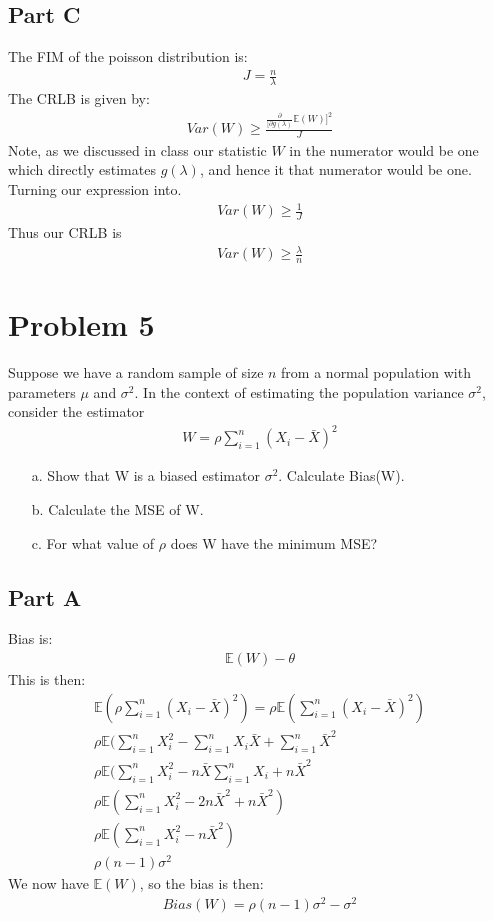 \documentclass{article}
\begin{document}
\subsection*{Part C}
The FIM of the poisson distribution is:
\begin{align*}
J = \frac{n}{\lambda}
\end{align*}
The CRLB is given by:
\begin{align*}
Var(W) \geq \frac{\frac{\partial}{[\partial g(\lambda)} \mathbb{E}(W)]^2 }{J}
\end{align*}
Note, as we discussed in class our statistic $W$ in the numerator would be one which directly estimates $g(\lambda)$, and hence it that numerator would be one. Turning our expression into.
\begin{align*}
Var(W) \geq \frac{1}{J} 
\end{align*}
Thus our CRLB is
\begin{align*}
\boxed{ Var(W) \geq \frac{\lambda}{n} }
\end{align*}
\clearpage

\section*{Problem 5}
Suppose we have a random sample of size $n$ from a normal population with parameters $\mu$ and $\sigma^2$. In the context of estimating the population variance $\sigma^2$, consider the estimator 
\begin{align*}
W = \rho \sum_{i=1}^{n} (X_i-\bar{X})^2
\end{align*}
\begin{enumerate}
\item[a.] Show that W is a biased estimator $\sigma^2$. Calculate Bias(W).
\item[b.] Calculate the MSE of W.
\item[c.] For what value of $\rho$ does W have the minimum MSE?
\end{enumerate}

\subsection*{Part A}
Bias is:
\begin{align*}
\mathbb{E}(W)-\theta
\end{align*}
This is then:
\begin{align*}
\mathbb{E}(\rho \sum_{i=1}^{n} (X_i-\bar{X})^2) = \rho \mathbb{E}(\sum_{i=1}^{n} (X_i-\bar{X})^2)\\
\rho \mathbb{E}(\sum_{i=1}^{n} X_i^2 -\sum_{i=1}^{n}X_i\bar{X}+\sum_{i=1}^{n}\bar{X}^2\\
\rho \mathbb{E}(\sum_{i=1}^{n} X_i^2 -n\bar{X}\sum_{i=1}^{n}X_i + n\bar{X}^2\\
\rho \mathbb{E}(\sum_{i=1}^{n} X_i^2 -2n\bar{X}^2 + n\bar{X}^2) \\
\rho \mathbb{E}(\sum_{i=1}^{n} X_i^2 - n\bar{X}^2) \\
\rho (n-1)\sigma^2
\end{align*}
We now have $\mathbb{E}(W)$, so the bias is then:
\begin{align*}
\boxed{ Bias(W) = \rho (n-1)\sigma^2 - \sigma^2 }
\end{align*}
\end{document}

